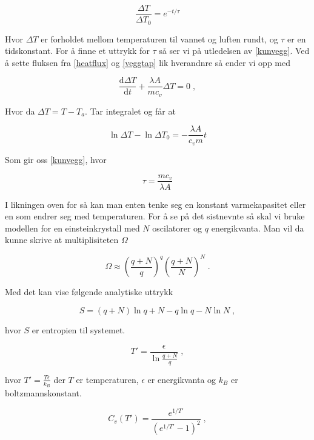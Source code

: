 \documentclass[ reprint, amsmath,amssymb, aps]{revtex4-2}
\begin{document}
\begin{equation}
\label{kunvegg}
\frac{\Delta{T}}{\Delta{T_0}} = e^{-t/\tau} 
\end{equation}

Hvor $\Delta{T}$ er forholdet mellom temperaturen til vannet og luften rundt, og $\tau$ er en tidskonstant. For å finne et uttrykk for $\tau$ så  ser vi på utledelsen av \ref{kunvegg}. Ved å sette fluksen fra \ref{heatflux} og \ref{veggtap} lik hverandnre så ender vi opp med

$$\frac{\mathrm{d} \Delta T}{\mathrm{d}t} + \frac{\lambda A}{m c_v} \Delta{T} = 0 \; ,$$

Hvor da $\Delta T = T - T_a$. Tar integralet og får at

$$\ln{\Delta T} - \ln{\Delta T_0} = -\frac{\lambda A}{c_v m} t$$

Som gir oss \ref{kunvegg}, hvor

\begin{equation}
\label{tau}
\tau = \frac{mc_v}{\lambda A}
\end{equation}

I likningen oven for så kan man enten tenke seg en konstant varmekapasitet eller en som endrer seg med temperaturen. For å se på det sistnevnte så skal vi bruke modellen for en einsteinkrystall med $N$ oscilatorer og $q$ energikvanta. Man vil da kunne skrive at multiplisiteten $\Omega$

\begin{equation}
\label{Ohm}
\Omega \approx \left ( \frac{q+N}{q}\right )^q \left ( \frac{q+N}{N}\right )^N \; .
\end{equation} 

Med det kan vise følgende analytiske uttrykk

\begin{equation}
\label{S}
 S = (q+N)\ln{q+N} - q \ln{q} - N\ln{N} \; ,
\end{equation}


hvor $S$ er entropien til systemet.

\begin{equation}
\label{T}
T' = \frac{\epsilon}{\ln{\frac{q+N}{q}}} \; ,
\end{equation}

hvor $T' = \frac{T \epsilon}{k_B}$ der $T$ er temperaturen, $\epsilon$ er energikvanta og $k_B$ er boltzmannskonstant.

\begin{equation}
\label{C}
C_v(T') = \frac{e^{1/T'}}{(e^{1/T'} - 1)^2} \; ,
\end{equation} 
\end{document}
